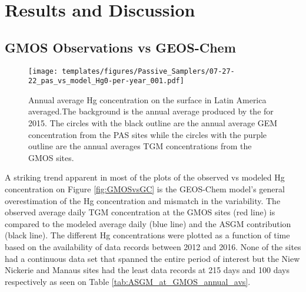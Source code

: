\section{Results and Discussion}
\subsection{GMOS Observations vs GEOS-Chem}
\begin{figure}[H]
\centering
  \texttt{[image: templates/figures/Passive\_Samplers/07-27-22\_pas\_vs\_model\_Hg0-per-year\_001.pdf]}
  \caption{Annual average Hg concentration on the surface in Latin America averaged.The background is the annual average \hgc produced by the \on for 2015. The circles with the black outline are the annual average GEM concentration from the PAS sites while the circles with the purple outline are the annual averages TGM concentrations from the GMOS sites.}
  \label{fig:06-12-22_pas_vs_model_Hg0-per-year_001}
  
  
\end{figure}
\FloatBarrier
\begin{flushleft}
A striking trend apparent in most of the plots of the observed vs modeled Hg concentration on Figure \ref{fig:GMOSvsGC} is the GEOS-Chem model's general overestimation of the Hg concentration and mismatch in the variability. The observed average daily TGM concentration at the GMOS sites (red line) is compared to the modeled \on average daily \hg (blue line) and the ASGM contribution (black line). The different Hg concentrations were plotted as a function of time based on the availability of data records between 2012 and 2016. None of the sites had a continuous data set that spanned the entire period of interest but the Niew Nickerie and Manaus sites had the least data records at 215 days and 100 days respectively as seen on Table \ref{tab:ASGM_at_GMOS_annual_avs}.   
\end{flushleft}
